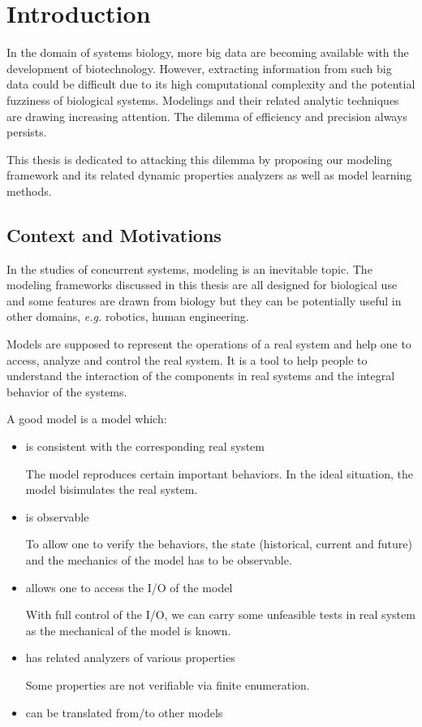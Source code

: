 \chapter{Introduction}\label{chap:intro}
\begin{mybox}
In the domain of systems biology, more big data are becoming available with the development of biotechnology.
However, extracting information from such big data could be difficult due to its high computational complexity and the potential fuzziness of biological systems.
Modelings and their related analytic techniques are drawing increasing attention.
The dilemma of efficiency and precision always persists.

This thesis is dedicated to attacking this dilemma by proposing our modeling framework and its related dynamic properties analyzers as well as model learning methods.
\end{mybox}

\section{Context and Motivations}

In the studies of concurrent systems, modeling is an inevitable topic.
The modeling frameworks discussed in this thesis are all designed for biological use and some features are drawn from biology but they can be potentially useful in other domains, \textit{e.g.} robotics, human engineering.

Models are supposed to represent the operations of a real system and help one to access, analyze and control the real system. 
It is a tool to help people to understand the interaction of the components in real systems and the integral behavior of the systems.

A good model is a model which:

\begin{itemize}
    \item is consistent with the corresponding real system
    
    The model reproduces certain important behaviors.
    In the ideal situation, the model bisimulates the real system.
    \item is observable
    
    To allow one to verify the behaviors, the state (historical, current and future) and the mechanics of the model has to be observable.
    
    \item allows one to access the I/O of the model
    
    With full control of the I/O, we can carry some unfeasible tests in real system as the mechanical of the model is known.
    \item has related analyzers of various properties
    
    Some properties are not verifiable via finite enumeration.
    \item can be translated from/to other models 
\end{itemize}

